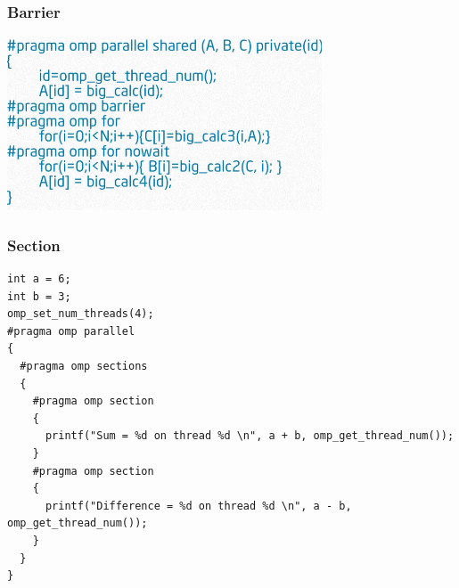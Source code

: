 \documentclass{beamer}
\begin{document}
\begin{frame}
  \frametitle{Barrier}
  \centering
  \includegraphics[width=0.7\textwidth]{barrier}
\end{frame}



\begin{frame}[fragile]
  \frametitle{Section}

\scriptsize
\lstset{language=C++}
\begin{lstlisting}
int a = 6;
int b = 3;
omp_set_num_threads(4);
#pragma omp parallel
{
  #pragma omp sections
  {
    #pragma omp section
    {
      printf("Sum = %d on thread %d \n", a + b, omp_get_thread_num());
    }
    #pragma omp section 
    {
      printf("Difference = %d on thread %d \n", a - b, omp_get_thread_num());
    }
  }
}
\end{lstlisting}

\end{frame}
\end{document}
